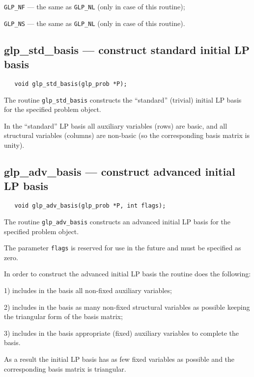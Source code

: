 \verb|GLP_NF| --- the same as \verb|GLP_NL| (only in case of this
routine);

\verb|GLP_NS| --- the same as \verb|GLP_NL| (only in case of this
routine).

\subsection{glp\_std\_basis --- construct standard initial LP basis}

\synopsis

\begin{verbatim}
   void glp_std_basis(glp_prob *P);
\end{verbatim}

\description

The routine \verb|glp_std_basis| constructs the ``standard'' (trivial)
initial LP basis for the specified problem object.

In the ``standard'' LP basis all auxiliary variables (rows) are basic,
and all structural variables (columns) are non-basic (so the
corresponding basis matrix is unity).

\subsection{glp\_adv\_basis --- construct advanced initial LP basis}

\synopsis

\begin{verbatim}
   void glp_adv_basis(glp_prob *P, int flags);
\end{verbatim}

\description

The routine \verb|glp_adv_basis| constructs an advanced initial LP
basis for the specified problem object.

The parameter \verb|flags| is reserved for use in the future and must
be specified as zero.

In order to construct the advanced initial LP basis the routine does
the following:

1) includes in the basis all non-fixed auxiliary variables;

2) includes in the basis as many non-fixed structural variables as
possible keeping the triangular form of the basis matrix;

3) includes in the basis appropriate (fixed) auxiliary variables to
complete the basis.

As a result the initial LP basis has as few fixed variables as possible
and the corresponding basis matrix is triangular.

